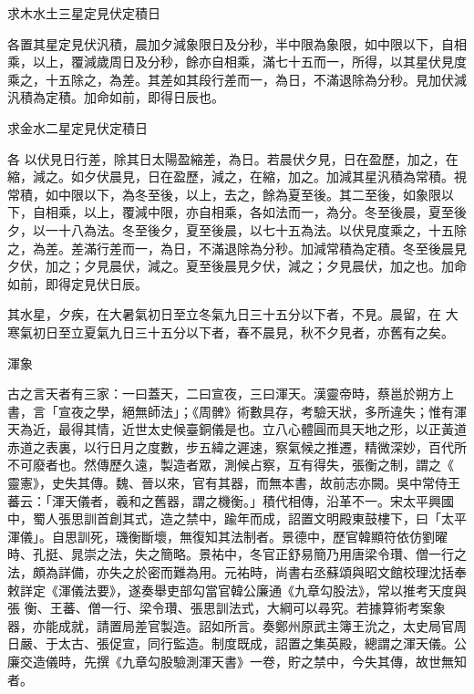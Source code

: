\begin{pinyinscope}
 求木水土三星定見伏定積日



 各置其星定見伏汎積，晨加夕減象限日及分秒，半中限為象限，如中限以下，自相乘，以上，覆減歲周日及分秒，餘亦自相乘，滿七十五而一，所得，以其星伏見度乘之，十五除之，為差。其差如其段行差而一，為日，不滿退除為分秒。見加伏減汎積為定積。加命如前，即得日辰也。



 求金水二星定見伏定積日



 各
 以伏見日行差，除其日太陽盈縮差，為日。若晨伏夕見，日在盈歷，加之，在縮，減之。如夕伏晨見，日在盈歷，減之，在縮，加之。加減其星汎積為常積。視常積，如中限以下，為冬至後，以上，去之，餘為夏至後。其二至後，如象限以下，自相乘，以上，覆減中限，亦自相乘，各如法而一，為分。冬至後晨，夏至後夕，以一十八為法。冬至後夕，夏至後晨，以七十五為法。以伏見度乘之，十五除之，為差。差滿行差而一，為日，不滿退除為分秒。加減常積為定積。冬至後晨見夕伏，加之；夕見晨伏，減之。夏至後晨見夕伏，減之；夕見晨伏，加之也。加命如前，即得定見伏日辰。



 其水星，夕疾，在大暑氣初日至立冬氣九日三十五分以下者，不見。晨留，在
 大寒氣初日至立夏氣九日三十五分以下者，春不晨見，秋不夕見者，亦舊有之矣。



 渾象



 古之言天者有三家：一曰蓋天，二曰宣夜，三曰渾天。漢靈帝時，蔡邕於朔方上書，言「宣夜之學，絕無師法」；《周髀》術數具存，考驗天狀，多所違失；惟有渾天為近，最得其情，近世太史候臺銅儀是也。立八心體圓而具天地之形，以正黃道赤道之表裏，以行日月之度數，步五緯之遲速，察氣候之推遷，精微深妙，百代所不可廢者也。然傳歷久遠，製造者眾，測候占察，互有得失，張衡之制，謂之《
 靈憲》，史失其傳。魏、晉以來，官有其器，而無本書，故前志亦闕。吳中常侍王蕃云：「渾天儀者，羲和之舊器，謂之機衡。」積代相傳，沿革不一。宋太平興國中，蜀人張思訓首創其式，造之禁中，踰年而成，詔置文明殿東鼓樓下，曰「太平渾儀」。自思訓死，璣衡斷壞，無復知其法制者。景德中，歷官韓顯符依仿劉曜時、孔挺、晁崇之法，失之簡略。景祐中，冬官正舒易簡乃用唐梁令瓚、僧一行之法，頗為詳備，亦失之於密而難為用。元祐時，尚書右丞蘇頌與昭文館校理沈括奉敕詳定《渾儀法要》，遂奏舉吏部勾當官韓公廉通《九章勾股法》，常以推考天度與張
 衡、王蕃、僧一行、梁令瓚、張思訓法式，大綱可以尋究。若據算術考案象器，亦能成就，請置局差官製造。詔如所言。奏鄭州原武主簿王沇之，太史局官周日嚴、于太古、張促宣，同行監造。制度既成，詔置之集英殿，總謂之渾天儀。公廉交造儀時，先撰《九章勾股驗測渾天書》一卷，貯之禁中，今失其傳，故世無知者。




\end{pinyinscope}
